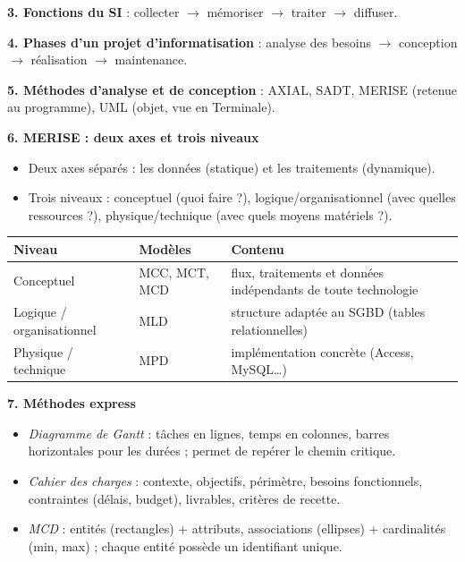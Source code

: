 \documentclass[11pt]{article}
\newcommand{\cle}[1]{{\popxbold\color{popdark}#1}}
\begin{document}
\begin{bilan}
\textbf{3. Fonctions du SI} : \cle{collecter} $\to$ \cle{m\'emoriser} $\to$ \cle{traiter} $\to$ \cle{diffuser}.

\textbf{4. Phases d'un projet d'informatisation} : analyse des besoins $\to$ conception $\to$ r\'ealisation $\to$ maintenance.

\textbf{5. M\'ethodes d'analyse et de conception} : AXIAL, SADT, \cle{MERISE} (retenue au programme), UML (objet, vue en Terminale).

\textbf{6. MERISE : deux axes et trois niveaux}
\begin{itemize}
  \item Deux axes s\'epar\'es : les \cle{donn\'ees} (statique) et les \cle{traitements} (dynamique).
  \item Trois niveaux : \cle{conceptuel} (quoi faire ?), \cle{logique/organisationnel} (avec quelles ressources ?), \cle{physique/technique} (avec quels moyens mat\'eriels ?).
\end{itemize}
\begin{center}
\begin{tabularx}{\linewidth}{|l|l|X|}
\hline
\rowcolor{popgreenL} \textbf{Niveau} & \textbf{Mod\`eles} & \textbf{Contenu} \\
\hline
Conceptuel & MCC, MCT, MCD & flux, traitements et donn\'ees ind\'ependants de toute technologie \\
\hline
Logique / organisationnel & MLD & structure adapt\'ee au SGBD (tables relationnelles) \\
\hline
Physique / technique & MPD & impl\'ementation concr\`ete (Access, MySQL\ldots) \\
\hline
\end{tabularx}
\end{center}

\textbf{7. M\'ethodes express}
\begin{itemize}
  \item \emph{Diagramme de Gantt} : t\^aches en lignes, temps en colonnes, barres horizontales pour les dur\'ees ; permet de rep\'erer le chemin critique.
  \item \emph{Cahier des charges} : contexte, objectifs, p\'erim\`etre, besoins fonctionnels, contraintes (d\'elais, budget), livrables, crit\`eres de recette.
  \item \emph{MCD} : entit\'es (rectangles) + attributs, associations (ellipses) + cardinalit\'es (min, max) ; chaque entit\'e poss\`ede un \cle{identifiant} unique.
\end{itemize}
\end{bilan}
\end{document}
